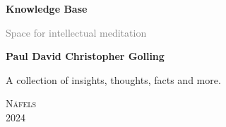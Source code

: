  \begin{titlepage}
    \centering
	
	\sffamily
    
    \vspace*{1cm} %

    \textbf{\Huge Knowledge Base}

    \vspace{0.5cm} %
    {\Large \textcolor{gray}{Space for intellectual meditation}}

    \vspace{2cm}

    \vspace{2cm}
    {\Large \textbf{Paul David Christopher Golling}}

    \vfill %

    {\large A collection of insights, thoughts, facts and more.}
    
    \vspace{0.8cm}
    {\large \textsc{Näfels}}\\
    {\large \textsc{2024}}
    
\end{titlepage}
